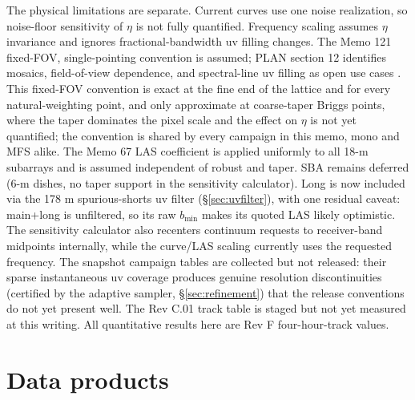 \documentclass[11pt]{article}
\begin{document}
The physical limitations are separate.  Current curves use one noise
realization, so noise-floor sensitivity of $\eta$ is not fully quantified.
Frequency scaling assumes $\eta$ invariance and ignores fractional-bandwidth uv
filling changes.  The Memo 121 fixed-FOV, single-pointing convention is assumed;
PLAN section 12 identifies mosaics, field-of-view dependence, and spectral-line
uv filling as open use cases \cite{plan}.  This fixed-FOV convention is exact
at the fine end of the lattice and for every natural-weighting point, and only
approximate at coarse-taper Briggs points, where the taper dominates the pixel
scale and the effect on $\eta$ is not yet quantified; the convention is shared
by every campaign in this memo, mono and MFS alike.  The Memo 67 LAS coefficient is
applied uniformly to all 18-m subarrays and is assumed independent of robust
and taper.  SBA remains deferred (6-m dishes, no taper support in the
sensitivity calculator).  Long is now included via the 178 m
spurious-shorts uv filter (\S\ref{sec:uvfilter}), with one residual caveat:
main+long is unfiltered, so its raw $b_{\min}$ makes its quoted LAS likely
optimistic.  The sensitivity calculator also recenters continuum requests to
receiver-band midpoints internally, while the curve/LAS scaling currently uses
the requested frequency.  The snapshot campaign tables are collected but not
released: their sparse instantaneous uv coverage produces genuine
resolution discontinuities (certified by the adaptive sampler,
\S\ref{sec:refinement}) that the release conventions do not yet present
well.  The Rev C.01 track table is staged but not yet measured at this
writing.  All quantitative results here are Rev F four-hour-track values.

\appendix
\section{Data products}
\end{document}
